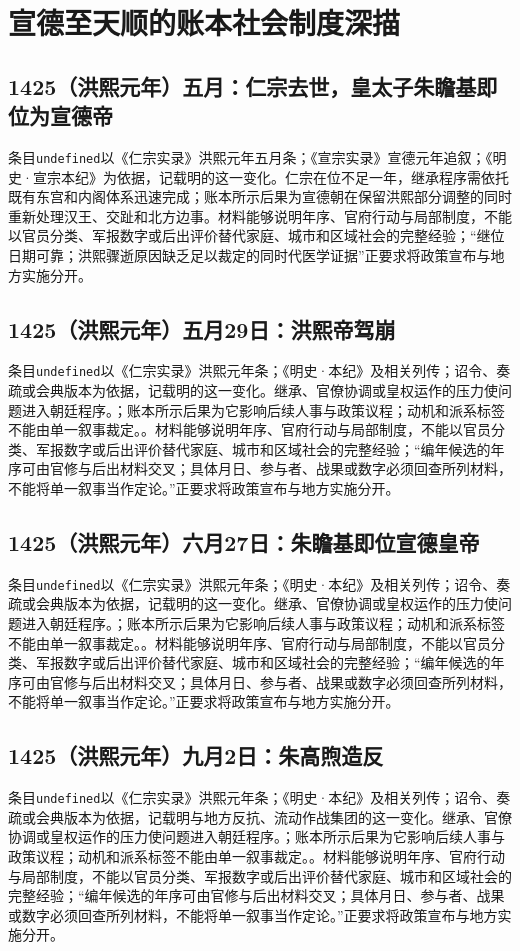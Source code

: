\section{宣德至天顺的账本社会制度深描}

\label{sec:ledger-depth-mid-ming}

\subsection{1425（洪熙元年）五月：仁宗去世，皇太子朱瞻基即位为宣德帝}
条目\texttt{undefined}以《仁宗实录》洪熙元年五月条；《宣宗实录》宣德元年追叙；《明史·宣宗本纪》为依据，记载明的这一变化。仁宗在位不足一年，继承程序需依托既有东宫和内阁体系迅速完成；账本所示后果为宣德朝在保留洪熙部分调整的同时重新处理汉王、交趾和北方边事。材料能够说明年序、官府行动与局部制度，不能以官员分类、军报数字或后出评价替代家庭、城市和区域社会的完整经验；“继位日期可靠；洪熙骤逝原因缺乏足以裁定的同时代医学证据”正要求将政策宣布与地方实施分开。

\subsection{1425（洪熙元年）五月29日：洪熙帝驾崩}
条目\texttt{undefined}以《仁宗实录》洪熙元年条；《明史·本纪》及相关列传；诏令、奏疏或会典版本为依据，记载明的这一变化。继承、官僚协调或皇权运作的压力使问题进入朝廷程序。；账本所示后果为它影响后续人事与政策议程；动机和派系标签不能由单一叙事裁定。。材料能够说明年序、官府行动与局部制度，不能以官员分类、军报数字或后出评价替代家庭、城市和区域社会的完整经验；“编年候选的年序可由官修与后出材料交叉；具体月日、参与者、战果或数字必须回查所列材料，不能将单一叙事当作定论。”正要求将政策宣布与地方实施分开。

\subsection{1425（洪熙元年）六月27日：朱瞻基即位宣德皇帝}
条目\texttt{undefined}以《仁宗实录》洪熙元年条；《明史·本纪》及相关列传；诏令、奏疏或会典版本为依据，记载明的这一变化。继承、官僚协调或皇权运作的压力使问题进入朝廷程序。；账本所示后果为它影响后续人事与政策议程；动机和派系标签不能由单一叙事裁定。。材料能够说明年序、官府行动与局部制度，不能以官员分类、军报数字或后出评价替代家庭、城市和区域社会的完整经验；“编年候选的年序可由官修与后出材料交叉；具体月日、参与者、战果或数字必须回查所列材料，不能将单一叙事当作定论。”正要求将政策宣布与地方实施分开。

\subsection{1425（洪熙元年）九月2日：朱高煦造反}
条目\texttt{undefined}以《仁宗实录》洪熙元年条；《明史·本纪》及相关列传；诏令、奏疏或会典版本为依据，记载明与地方反抗、流动作战集团的这一变化。继承、官僚协调或皇权运作的压力使问题进入朝廷程序。；账本所示后果为它影响后续人事与政策议程；动机和派系标签不能由单一叙事裁定。。材料能够说明年序、官府行动与局部制度，不能以官员分类、军报数字或后出评价替代家庭、城市和区域社会的完整经验；“编年候选的年序可由官修与后出材料交叉；具体月日、参与者、战果或数字必须回查所列材料，不能将单一叙事当作定论。”正要求将政策宣布与地方实施分开。

